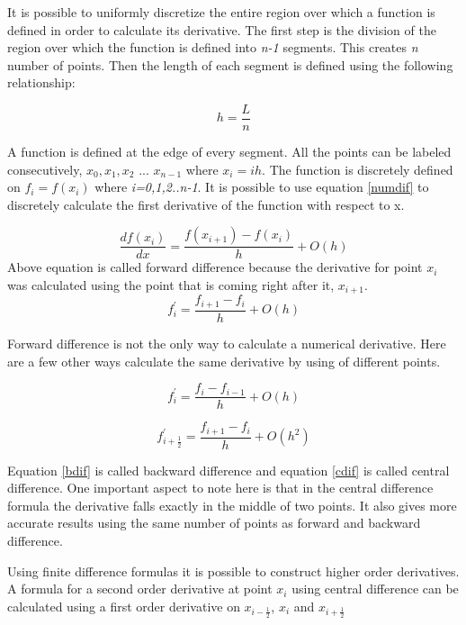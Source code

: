 \begin{doublespace}
It is possible to uniformly discretize the entire region over which a function is defined in order to calculate its derivative. The first step is the division of the region over which the function is defined into \textit{n-1} segments. This creates \textit{n} number of points. Then the length of each segment is defined using the following relationship:

\begin{equation}
h=\frac{L}{n}
\end{equation}

A function is defined at the edge of every segment. All the points can be labeled consecutively, $x_0,x_1,x_2$ ... $x_{n-1}$ where $x_i=ih$. The function is discretely defined on \textit{$f_{i}=f(x_{i})$} where\textit{ i=0,1,2..n-1}. It is possible to use equation  \ref{numdif} to discretely calculate the first derivative of the function with respect to x.

\begin{equation}
\frac{df(x_i)}{dx}=\frac{f(x_{i+1})-f(x_i)}{h} + O(h)
\end{equation}
Above equation is called forward difference because the derivative for point $x_i$ was calculated using the point that is coming right after it, $x_{i+1}$.
\begin{equation}
f^{'}_i=\frac{f_{i+1}-f_i}{h}+ O(h)
\end{equation}

Forward difference is not the only way to calculate a numerical derivative. Here are a few other ways calculate the same derivative by using of different points.

\begin{equation}
f^{'}_i=\frac{f_{i}-f_{i-1}}{h}+ O(h)
\label{bdif}
\end{equation}

\begin{equation}
f^{'}_{i+\frac{1}{2}}=\frac{f_{i+1}-f_i}{h}+ O(h^2)
\label{cdif}
\end{equation}

Equation \ref{bdif} is called backward difference and equation \ref{cdif} is called central difference. One important aspect to note here is that in the central difference formula the derivative falls exactly in the middle of two points. It also gives more accurate results using the same number of points as forward and backward difference. 

Using finite difference formulas it is possible to construct higher order derivatives. A formula for a second order derivative at point $x_i$ using central difference can be calculated using a first order derivative on $x_{i-\frac{1}{2}}$, $x_i$ and $x_{i+\frac{1}{2}}$  


\end{doublespace}

